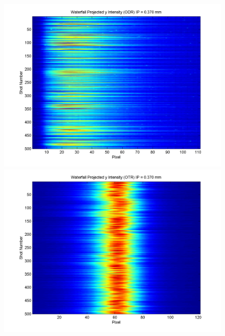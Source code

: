 \documentclass[12pt]{article}
\begin{document}
\begin{figure}
\begin{center}
\includegraphics[scale=0.5]{Figures/ProjY_wfall_ODR_370.PNG}
\includegraphics[scale=0.5]{Figures/ProjY_wfall_OTR_370.PNG}
\caption{}
\end{center}
\end{figure}
\end{document}
